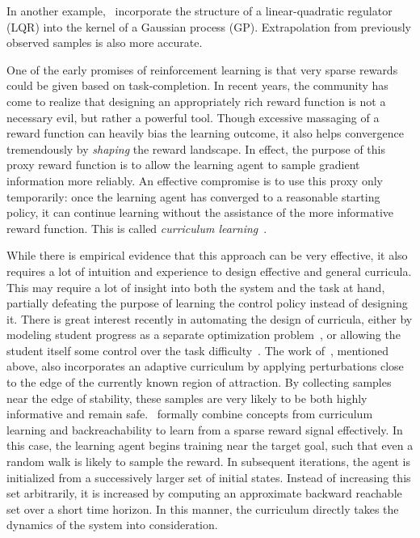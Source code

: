 In another example,~\textcite{marco2017design} incorporate the structure of a linear-quadratic regulator (LQR) into the kernel of a Gaussian process (GP). Extrapolation from previously observed samples is also more accurate. \par
One of the early promises of reinforcement learning is that very sparse rewards could be given based on task-completion. In recent years, the community has come to realize that designing an appropriately rich reward function is not a necessary evil, but rather a powerful tool. Though excessive massaging of a reward function can heavily bias the learning outcome, it also helps convergence tremendously by \emph{shaping} the reward landscape. In effect, the purpose of this proxy reward function is to allow the learning agent to sample gradient information more reliably. An effective compromise is to use this proxy only temporarily: once the learning agent has converged to a reasonable starting policy, it can continue learning without the assistance of the more informative reward function. This is called \emph{curriculum learning}~\cite{bengio2009curriculum,karpathy2012curriculum}. \par
While there is empirical evidence that this approach can be very effective, it also requires a lot of intuition and experience to design effective and general curricula. This may require a lot of insight into both the system and the task at hand, partially defeating the purpose of learning the control policy instead of designing it. There is great interest recently in automating the design of curricula, either by modeling student progress as a separate optimization problem~\cite{portelas2019teacher}, or allowing the student itself some control over the task difficulty~\cite{klink2019self}. The work of~\textcite{kumar2018improving}, mentioned above, also incorporates an adaptive curriculum by applying perturbations close to the edge of the currently known region of attraction. By collecting samples near the edge of stability, these samples are very likely to be both highly informative and remain safe.~\textcite{ivanovic2019barc} formally combine concepts from curriculum learning and backreachability to learn from a sparse reward signal effectively. In this case, the learning agent begins training near the target goal, such that even a random walk is likely to sample the reward. In subsequent iterations, the agent is initialized from a successively larger set of initial states. Instead of increasing this set arbitrarily, it is increased by computing an approximate backward reachable set over a short time horizon. In this manner, the curriculum directly takes the dynamics of the system into consideration.